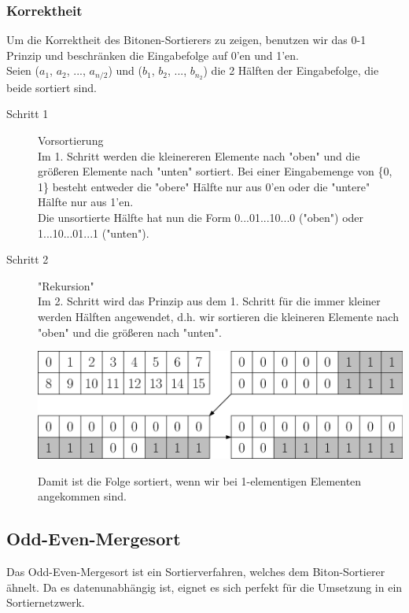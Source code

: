 \documentclass[11pt]{article}
\begin{document}
\subsubsection{Korrektheit}
Um die Korrektheit des Bitonen-Sortierers zu zeigen, benutzen wir das 0-1 Prinzip und beschränken die Eingabefolge auf 0'en und 1'en.\\
Seien ($a_1$, $a_2$, ..., $a_{n/2}$) und ($b_1$, $b_2$, ..., $b_{n_2}$) die 2 Hälften der Eingabefolge, die beide sortiert sind.
\begin{description}
\item[Schritt 1] Vorsortierung\\Im 1. Schritt werden die kleinereren Elemente nach "oben" und die größeren Elemente nach "unten" sortiert. Bei einer Eingabemenge von \{0, 1\} besteht entweder die "obere" Hälfte nur aus 0'en oder die "untere" Hälfte nur aus 1'en.\\ Die unsortierte Hälfte hat nun die Form 0...01...10...0 ("oben") oder 1...10...01...1 ("unten").
\item[Schritt 2] "Rekursion"\\Im 2. Schritt wird das Prinzip aus dem 1. Schritt für die immer kleiner werden Hälften angewendet, d.h. wir sortieren die kleineren Elemente nach "oben" und die größeren nach "unten".\\
\begin{center}
\includegraphics[scale=0.4]{korrektheitBS.eps}
\end{center}
Damit ist die Folge sortiert, wenn wir bei 1-elementigen Elementen angekommen sind. 
\end{description}
\subsection{Odd-Even-Mergesort}
Das Odd-Even-Mergesort ist ein Sortierverfahren, welches dem Biton-Sortierer ähnelt. Da es datenunabhängig ist, eignet es sich perfekt für die Umsetzung in ein Sortiernetzwerk.
\end{document}
